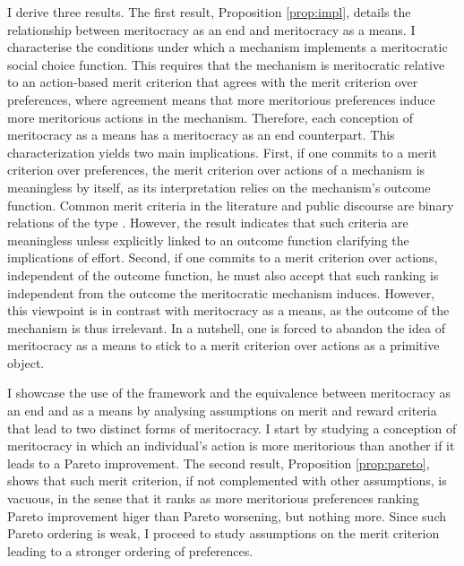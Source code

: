 I derive three results. The first result, Proposition \ref{prop:impl}, details the relationship between meritocracy as an end and meritocracy as a means. I characterise the conditions under which a mechanism implements a meritocratic social choice function. This requires that the mechanism is meritocratic relative to an action-based merit criterion that agrees with the merit criterion over preferences, where agreement means that more meritorious preferences induce more meritorious actions in the mechanism. Therefore, each conception of meritocracy as a means has a meritocracy as an end counterpart. This characterization yields two main implications. First, if one commits to a merit criterion over preferences, the merit criterion over actions of a mechanism is meaningless by itself, as its interpretation relies on the mechanism's outcome function. Common merit criteria in the literature and public discourse are binary relations of the type . However, the result indicates that such criteria are meaningless unless explicitly linked to an outcome function clarifying the implications of effort. Second, if one commits to a merit criterion over actions, independent of the outcome function, he must also accept that such ranking is independent from the outcome the meritocratic mechanism induces. However, this viewpoint is in contrast with meritocracy as a means, as the outcome of the mechanism is thus irrelevant. In a nutshell, one is forced to abandon the idea of meritocracy as a means to stick to a merit criterion over actions as a primitive object.

I showcase the use of the framework and the equivalence between meritocracy as an end and as a means by analysing assumptions on merit and reward criteria that lead to two distinct forms of meritocracy. I start by studying a conception of meritocracy in which an individual's action is more meritorious than another if it leads to a Pareto improvement. The second result, Proposition \ref{prop:pareto}, shows that such merit criterion, if not complemented with other assumptions, is vacuous, in the sense that it ranks as more meritorious preferences ranking Pareto improvement higer than Pareto worsening, but nothing more. Since such Pareto ordering is weak, I proceed to study assumptions on the merit criterion leading to a stronger ordering of preferences.

